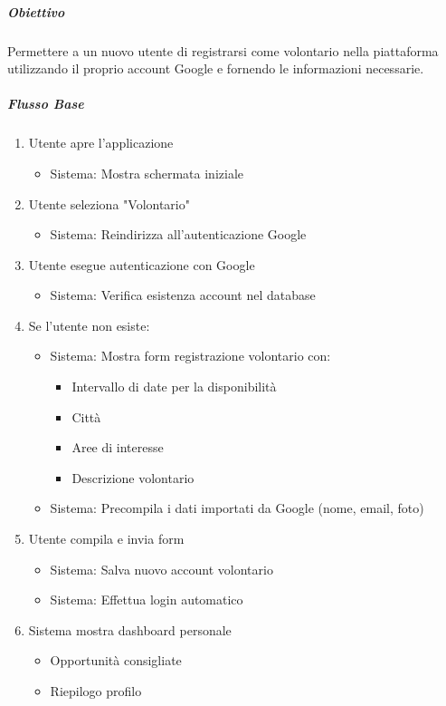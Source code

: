 \subparagraph{Obiettivo}
Permettere a un nuovo utente di registrarsi come volontario nella piattaforma utilizzando il proprio account Google e fornendo le informazioni necessarie.

\subparagraph{Flusso Base}
\begin{enumerate}
\item Utente apre l'applicazione
    \begin{itemize}
    \item Sistema: Mostra schermata iniziale
    \end{itemize}
\item Utente seleziona "Volontario"
    \begin{itemize}
    \item Sistema: Reindirizza all'autenticazione Google
    \end{itemize}
\item Utente esegue autenticazione con Google
    \begin{itemize}
    \item Sistema: Verifica esistenza account nel database
    \end{itemize}
\item Se l'utente non esiste:
    \begin{itemize}
    \item Sistema: Mostra form registrazione volontario con:
        \begin{itemize}
        \item Intervallo di date per la disponibilità
        \item Città
        \item Aree di interesse
        \item Descrizione volontario
        \end{itemize}
    \item Sistema: Precompila i dati importati da Google (nome, email, foto)
    \end{itemize}
\item Utente compila e invia form
    \begin{itemize}
    \item Sistema: Salva nuovo account volontario
    \item Sistema: Effettua login automatico
    \end{itemize}
\item Sistema mostra dashboard personale
    \begin{itemize}
    \item Opportunità consigliate
    \item Riepilogo profilo
    \end{itemize}
\end{enumerate}

